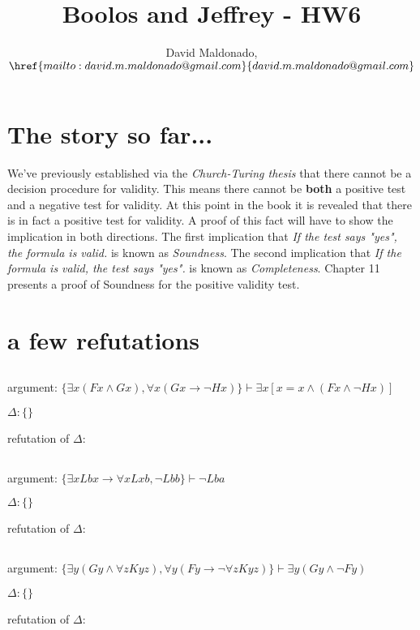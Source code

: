 \documentclass[a4paper,11pt]{article}
\author{David Maldonado, $\href{mailto:david.m.maldonado@gmail.com}%
{david.m.maldonado@gmail.com}$}
\title{Boolos and Jeffrey - HW6}
\begin{document}
\maketitle


\section{The story so far...}

We've previously established via the \textit{Church-Turing thesis} that there cannot 
be a decision procedure for validity. This means there cannot be \textbf{both} a positive test
and a negative test for validity. At this point in the book it is revealed that there is in fact a 
positive test for validity. A proof of this fact will have to show the implication in both directions.
The first implication that \textit{If the test says "yes", the formula is valid.} is known as \textit{Soundness}.
The second implication that \textit{If the formula is valid, the test says "yes".} is known as \textit{Completeness}.
Chapter 11 presents a proof of Soundness for the positive validity test.

\section{a few refutations}


\subsection{}

argument: $ \{ \exists x(Fx \land Gx), \forall x(Gx \rightarrow \lnot Hx) \} \vdash \exists x[x=x \land (Fx \land \lnot Hx)] $

\bigskip

\noindent $\Delta: \{ \}$

\bigskip

\noindent refutation of $\Delta:$


\subsection{}

argument: $\{ \exists x Lbx \rightarrow \forall x Lxb, \lnot Lbb \} \vdash \lnot Lba $

\bigskip

\noindent $\Delta: \{ \}$

\bigskip

\noindent refutation of $\Delta:$


\subsection{}

argument: $\{ \exists y(Gy \land \forall z Kyz), \forall y(Fy \rightarrow \lnot \forall z Kyz) \} \vdash \exists y(Gy \land \lnot Fy) $

\bigskip

\noindent $\Delta: \{ \} $

\bigskip

\noindent refutation of $\Delta:$
\end{document}
